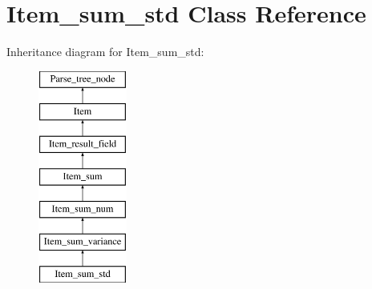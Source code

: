 \hypertarget{classItem__sum__std}{}\section{Item\+\_\+sum\+\_\+std Class Reference}
\label{classItem__sum__std}
Inheritance diagram for Item\+\_\+sum\+\_\+std\+:\begin{figure}[H]
\begin{center}
\leavevmode
\includegraphics[height=7.000000cm]{classItem__sum__std}
\end{center}
\end{figure}
